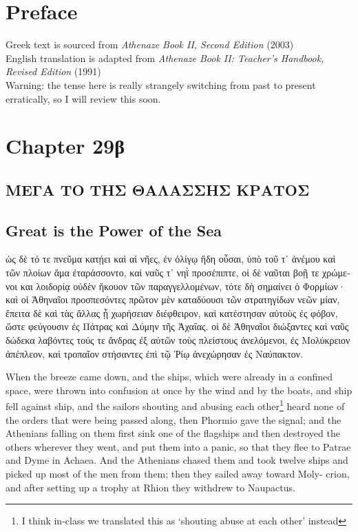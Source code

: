 \documentclass{article}
\begin{document}
\section{Preface}

Greek text is sourced from \emph{Athenaze Book II, Second Edition} (2003) \\
English translation is adapted from \emph{Athenaze Book II: Teacher's Handbook, Revised Edition} (1991) \\

Warning: the tense here is really strangely switching from past to present erratically,
so I will review this soon.

\section{Chapter 29\textgreek{β}}

\subsection*{\textgreek{ΜΕΓΑ ΤΟ ΤΗΣ ΘΑΛΑΣΣΗΣ ΚΡΑΤΟΣ}}
\subsection*{Great is the Power of the Sea}

\begin{greek}
ὡς δὲ τό τε πνεῦμα κατῄει καὶ αἱ νῆες, ἐν ὀλίγῳ ἤδη οὖσαι,
ὑπὸ τοῦ τ᾿ ἀνέμου καὶ τῶν πλοίων ἅμα ἐταράσσοντο, καὶ ναῦς τ᾿ νηῒ προσέπιπτε,
οἱ δὲ ναῦται βοῇ τε χρώμενοι και λοιδορίᾳ οὐδὲν ἤκουον τῶν παραγγελλομένων, τότε δὴ σημαίνει ὁ Φορμίων·
καὶ οἱ Ἀθηναῖοι προσπεσόντες πρῶτον μὲν καταδύουσι τῶν στρατηγίδων νεῶν μίαν, ἔπειτα δὲ καὶ τὰς ἄλλας ᾗ χωρήσειαν διέφθειρον,
καὶ κατέστησαν αὐτοὺς ἐς φόβον, ὥστε φεύγουσιν ἐς Πάτρας καὶ Δύμην τῆς Ἀχαΐας.
οἱ δὲ Ἀθηναῖοι διώξαντες καὶ ναῦς δώδεκα λαβόντες τούς τε ἄνδρας ἐξ αὐτῶν τοὺς πλείστους ἀνελόμενοι,
ἐς Μολύκρειον ἀπέπλεον, καὶ τροπαῖον στήσαντες ἐπὶ τῷ Ῥίῳ ἀνεχώρησαν ἐς Ναύπακτον. \\
\end{greek}


When the breeze came down, and the ships, which were already in a confined space, were thrown into confusion at once by the wind and by the boats,
and ship fell against ship, and the sailors shouting and abusing each other\footnote{I think in-class we translated this as `shouting abuse at each other' instead}
heard none of the orders that were being passed along,
then Phormio gave the signal; and the Athenians falling on them first sink one of the flagships and then destroyed the others wherever they went,
and put them into a panic, so that they flee to Patrae and Dyme in Achaea.
And the Athenians chased them and took twelve ships and picked up most of the men from them;
then they sailed away toward Moly- crion,
and after setting up a trophy at Rhion they withdrew to Naupactus. \\
\end{document}
